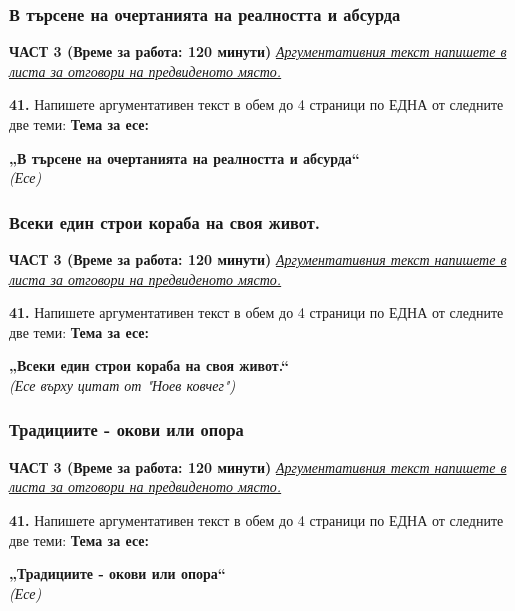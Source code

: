 \documentclass[12pt,a4paper]{article}
\begin{document}
\subsubsection{В търсене на очертанията на реалността и абсурда}
\vspace{0.5cm}
\begin{center}
\textbf{ЧАСТ 3 (Време за работа: 120 минути)}
\vspace{0.2cm}
{\textit{\underline{Аргументативния текст напишете в листа за отговори на предвиденото място.}}}
\vspace{0.1cm}
\end{center}
\textbf{41.} Напишете аргументативен текст в обем до 4 страници по ЕДНА от следните две теми:
\vspace{0.2cm}
\textbf{Тема за есе:}
\vspace{0.1cm}
\begin{center}
\textbf{„В търсене на очертанията на реалността и абсурда“}
\\
\textit{(Есе)}
\end{center}

\subsubsection{Всеки един строи кораба на своя живот.}
\vspace{0.5cm}
\begin{center}
\textbf{ЧАСТ 3 (Време за работа: 120 минути)}
\vspace{0.2cm}
{\textit{\underline{Аргументативния текст напишете в листа за отговори на предвиденото място.}}}
\vspace{0.1cm}
\end{center}
\textbf{41.} Напишете аргументативен текст в обем до 4 страници по ЕДНА от следните две теми:
\vspace{0.2cm}
\textbf{Тема за есе:}
\vspace{0.1cm}
\begin{center}
\textbf{„Всеки един строи кораба на своя живот.“}
\\
\textit{(Есе върху цитат от "Ноев ковчег")}
\end{center}

\subsubsection{Традициите - окови или опора}
\vspace{0.5cm}
\begin{center}
\textbf{ЧАСТ 3 (Време за работа: 120 минути)}
\vspace{0.2cm}
{\textit{\underline{Аргументативния текст напишете в листа за отговори на предвиденото място.}}}
\vspace{0.1cm}
\end{center}
\textbf{41.} Напишете аргументативен текст в обем до 4 страници по ЕДНА от следните две теми:
\vspace{0.2cm}
\textbf{Тема за есе:}
\vspace{0.1cm}
\begin{center}
\textbf{„Традициите - окови или опора“}
\\
\textit{(Есе)}
\end{center}
\end{document}
